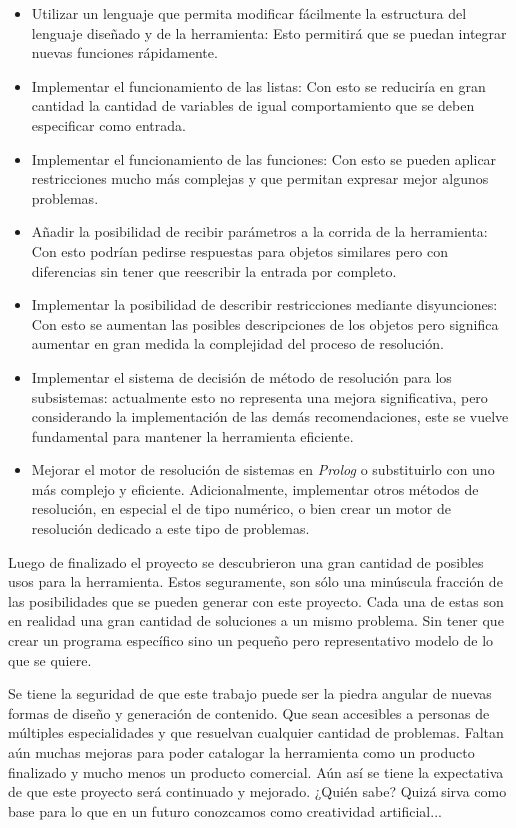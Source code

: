 \begin{itemize}
\item{Utilizar un lenguaje que permita modificar fácilmente la estructura
del lenguaje diseñado y de la herramienta: Esto permitirá que se puedan integrar
nuevas funciones rápidamente.}

\item{Implementar el funcionamiento de las listas: Con esto se reduciría
en gran cantidad la cantidad de variables de igual comportamiento que se
deben especificar como entrada.}

\item{Implementar el funcionamiento de las funciones: Con esto se pueden
aplicar restricciones mucho más complejas y que permitan expresar mejor
algunos problemas.}

\item{Añadir la posibilidad de recibir parámetros a la corrida de la 
herramienta: Con esto podrían pedirse respuestas para objetos similares pero
con diferencias sin tener que reescribir la entrada por completo.}

\item{Implementar la posibilidad de describir restricciones mediante
disyunciones: Con esto se aumentan las posibles descripciones de los
objetos pero significa aumentar en gran medida la complejidad del proceso de
resolución.}

\item{Implementar el sistema de decisión de método de resolución para
los subsistemas: actualmente esto no representa una mejora significativa, pero
considerando la implementación de las demás recomendaciones, este se vuelve
fundamental para mantener la herramienta eficiente.}

\item{Mejorar el motor de resolución de sistemas en \textit{Prolog} o substituirlo
con uno más complejo y eficiente. Adicionalmente, implementar otros métodos de
resolución, en especial el de tipo numérico, o bien crear un motor de 
resolución dedicado a este tipo de problemas.}
\end{itemize}

Luego de finalizado el proyecto se descubrieron una gran cantidad de posibles
usos para la herramienta. Estos seguramente, son sólo una minúscula
fracción de las posibilidades que se pueden generar con este proyecto. Cada una
de estas son en realidad una gran cantidad de soluciones a un mismo problema.
Sin tener que crear un programa específico sino un pequeño pero representativo
modelo de lo que se quiere.

Se tiene la seguridad de que este trabajo puede ser la piedra angular de nuevas 
formas de diseño y generación de contenido. Que sean accesibles a personas
de múltiples especialidades y que resuelvan cualquier cantidad de problemas.
Faltan aún muchas mejoras para poder catalogar la herramienta como un producto
finalizado y mucho menos un producto comercial. Aún así se tiene la expectativa
de que este proyecto será continuado y mejorado. ¿Quién sabe? Quizá sirva
como base para lo que en un futuro conozcamos como creatividad artificial...
